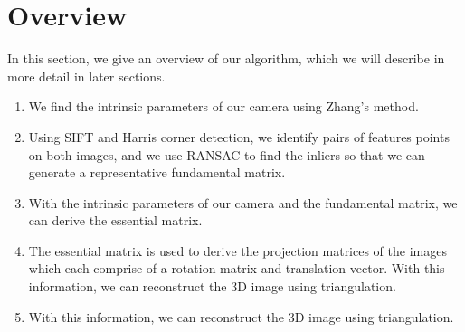 \section{Overview}
\label{s:overview}

In this section, we give an overview of our algorithm, which we will describe in more detail
in later sections.

\begin{enumerate}
\item{We find the intrinsic parameters of our camera using Zhang's method.}
\item{Using SIFT and Harris corner detection, we identify pairs of features points on both images, and we use RANSAC to find the inliers so that we can generate a representative fundamental matrix.}
\item{With the intrinsic parameters of our camera and the fundamental matrix, we can derive the essential matrix.}
\item{The essential matrix is used to derive the projection matrices of the images which each comprise of a rotation matrix and translation vector. With this information, we can reconstruct the 3D image using triangulation.}
\item{With this information, we can reconstruct the 3D image using triangulation.}
\end{enumerate}
